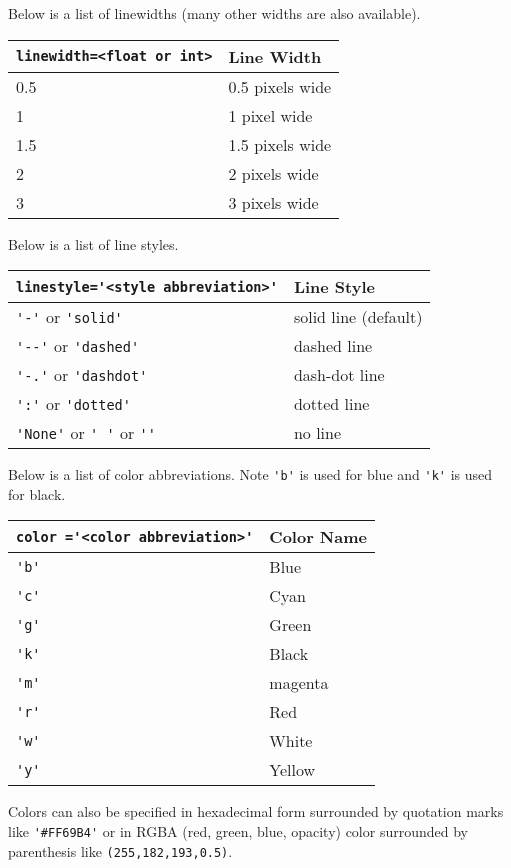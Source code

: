 \documentclass{book}
\newcommand{\passthrough}[1]{#1}
\begin{document}
Below is a list of linewidths (many other widths are also available).

\begin{longtable}[]{@{}ll@{}}
\toprule
\passthrough{\lstinline!linewidth=<float or int>!} & Line
Width\tabularnewline
\midrule
\endhead
0.5 & 0.5 pixels wide\tabularnewline
1 & 1 pixel wide\tabularnewline
1.5 & 1.5 pixels wide\tabularnewline
2 & 2 pixels wide\tabularnewline
3 & 3 pixels wide\tabularnewline
\bottomrule
\end{longtable}

Below is a list of line styles.

\begin{longtable}[]{@{}ll@{}}
\toprule
\passthrough{\lstinline!linestyle='<style abbreviation>'!} & Line
Style\tabularnewline
\midrule
\endhead
\passthrough{\lstinline!'-'!} or \passthrough{\lstinline!'solid'!} &
solid line (default)\tabularnewline
\passthrough{\lstinline!'--'!} or \passthrough{\lstinline!'dashed'!} &
dashed line\tabularnewline
\passthrough{\lstinline!'-.'!} or \passthrough{\lstinline!'dashdot'!} &
dash-dot line\tabularnewline
\passthrough{\lstinline!':'!} or \passthrough{\lstinline!'dotted'!} &
dotted line\tabularnewline
\passthrough{\lstinline!'None'!} or \passthrough{\lstinline!' '!} or
\passthrough{\lstinline!''!} & no line\tabularnewline
\bottomrule
\end{longtable}

Below is a list of color abbreviations. Note
\passthrough{\lstinline!'b'!} is used for blue and
\passthrough{\lstinline!'k'!} is used for black.

\begin{longtable}[]{@{}ll@{}}
\toprule
\passthrough{\lstinline!color ='<color abbreviation>'!} & Color
Name\tabularnewline
\midrule
\endhead
\passthrough{\lstinline!'b'!} & Blue\tabularnewline
\passthrough{\lstinline!'c'!} & Cyan\tabularnewline
\passthrough{\lstinline!'g'!} & Green\tabularnewline
\passthrough{\lstinline!'k'!} & Black\tabularnewline
\passthrough{\lstinline!'m'!} & magenta\tabularnewline
\passthrough{\lstinline!'r'!} & Red\tabularnewline
\passthrough{\lstinline!'w'!} & White\tabularnewline
\passthrough{\lstinline!'y'!} & Yellow\tabularnewline
\bottomrule
\end{longtable}

Colors can also be specified in hexadecimal form surrounded by quotation
marks like \passthrough{\lstinline!'#FF69B4'!} or in RGBA (red, green,
blue, opacity) color surrounded by parenthesis like
\passthrough{\lstinline!(255,182,193,0.5)!}.
\end{document}
